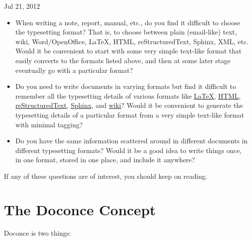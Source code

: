 \documentclass{book}
\begin{document}

\begin{center}
Jul 21, 2012
\end{center}


\begin{itemize}
 \item When writing a note, report, manual, etc., do you find it difficult
   to choose the typesetting format? That is, to choose between plain
   (email-like) text, wiki, Word/OpenOffice, {\LaTeX}, HTML,
   reStructuredText, Sphinx, XML, etc.  Would it be convenient to
   start with some very simple text-like format that easily converts
   to the formats listed above, and then at some later stage
   eventually go with a particular format?

 \item Do you need to write documents in varying formats but find it
   difficult to remember all the typesetting details of various
   formats like \href{{http://refcards.com/docs/silvermanj/amslatex/LaTeXRefCard.v2.0.pdf}}{LaTeX}, \href{{http://www.htmlcodetutorial.com/}}{HTML}, \href{{http://docutils.sourceforge.net/docs/ref/rst/restructuredtext.html}}{reStructuredText}, \href{{http://sphinx.pocoo.org/contents.html}}{Sphinx}, and \href{{http://code.google.com/p/support/wiki/WikiSyntax}}{wiki}? Would it be convenient
   to generate the typesetting details of a particular format from a
   very simple text-like format with minimal tagging?

 \item Do you have the same information scattered around in different
   documents in different typesetting formats? Would it be a good idea
   to write things once, in one format, stored in one place, and
   include it anywhere?
\end{itemize}

\noindent
If any of these questions are of interest, you should keep on reading.


\section{The Doconce Concept}

Doconce is two things:
\end{document}
